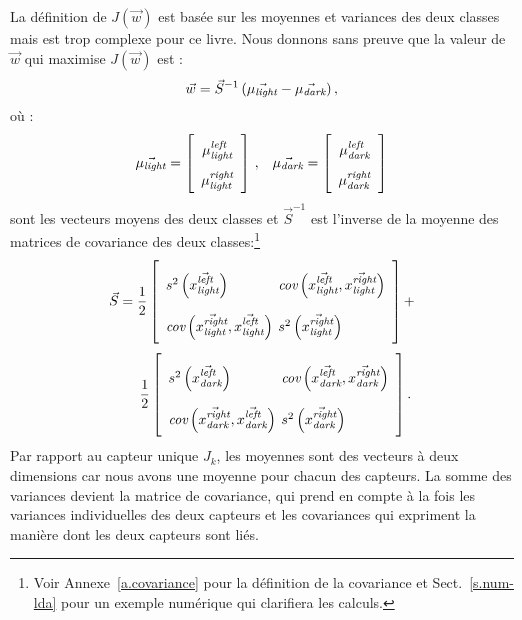 La définition de $J(\vec{w})$ est basée sur les moyennes et variances des deux classes mais est trop complexe pour ce livre. Nous donnons sans preuve que la valeur de $\vec{w}$ qui maximise $J(\vec{w})$ est :
\begin{equation}
\vec{w} = \vec{S}^{-1}\,(\vec{\mu_{\textit{\scriptsize light}}}-\vec{\mu_{\textit{\scriptsize dark}}})\,,\label{eq.wLDA}
\end{equation}
où :
\[
\renewcommand{\arraystretch}{1.8}
\vec{\mu_{\sub{light}}}=\left[
\begin{array}{c}\mu_{\sub{light}}^{\sub{left}}\\
\mu_{\sub{light}}^{\sub{right}}\end{array}
\right]\,,\;\;\;
\vec{\mu_{\sub{dark}}}=\left[
\begin{array}{c}\mu_{\sub{dark}}^{\sub{left}}\\
\mu_{\sub{dark}}^{\sub{right}}\end{array}\right]
\]
sont les vecteurs moyens des deux classes et $\vec{S}^{-1}$ est l'inverse de la moyenne des matrices de covariance des deux classes:\footnote{Voir Annexe~\ref{a.covariance} pour la définition de la covariance et Sect.~\ref{s.num-lda} pour un exemple numérique qui clarifiera les calculs.}
\[
\renewcommand{\arraystretch}{2.5}
\vec{S} = \frac{1}{2}
\left[\begin{array}{l@{\hspace{.4em}}l}
s^2\left(\vec{x^{\sub{left}}_\sub{light}}\right) &
\textit{cov}\left(\vec{x^{\sub{left}}_\sub{light}},\vec{x^{\sub{right}}_\sub{light}}\right)\\
\textit{cov}\left(\vec{x^{\sub{right}}_\sub{light}},\vec{x^{\sub{left}}_\sub{light}}\right)&
s^2\left(\vec{x^{\sub{right}}_\sub{light}}\right)
\end{array}\right]
+
\]
\[
\renewcommand{\arraystretch}{2.5}
\qquad\frac{1}{2}\left[\begin{array}{l@{\hspace{.4em}}l}
s^2\left(\vec{x^{\sub{left}}_\sub{dark}}\right)&
\textit{cov}\left(\vec{x^{\sub{left}}_\sub{dark}},\vec{x^{\sub{right}}_\sub{dark}}\right)\\
\textit{cov}\left(\vec{x^{\sub{right}}_\sub{dark}},\vec{x^{\sub{left}}_\sub{dark}}\right)&
s^2\left(\vec{x^{\sub{right}}_\sub{dark}}\right)
\end{array}\right].
\]
Par rapport au capteur unique $J_k$, les moyennes sont des vecteurs à deux dimensions car nous avons une moyenne pour chacun des capteurs. La somme des variances devient la matrice de covariance, qui prend en compte à la fois les variances individuelles des deux capteurs et les covariances qui expriment la manière dont les deux capteurs sont liés.

